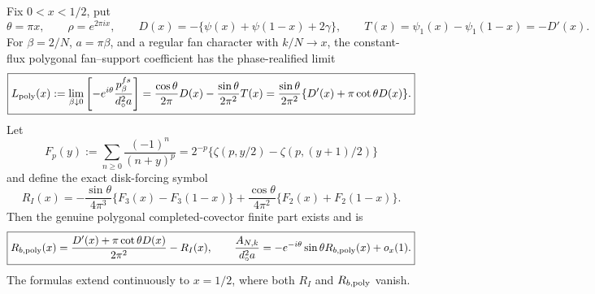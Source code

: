 \begin{lemma}
\label{JC:lem:regular-polygonal-mixed-finite-part}
Fix $0<x<1/2$, put
\[
 \theta=\pi x,\qquad \rho=e^{2\pi ix},\qquad
 D(x)=-\{\psi(x)+\psi(1-x)+2\gamma\},
 \qquad T(x)=\psi_1(x)-\psi_1(1-x)=-D'(x).
\]
For $\beta=2/N$, $a=\pi\beta$, and a regular fan character with
$k/N\to x$, the constant-flux polygonal fan--support coefficient has the
phase-realified limit
\begin{equation}\label{JC:eq:regular-polygonal-mixed-finite-part}
 \boxed{
 L_{\rm poly}(x):=
 \lim_{\beta\downarrow0}
 \left[-e^{i\theta}\frac{p^{fs}_\beta}{d_\circ^2a}\right]
 =\frac{\cos\theta}{2\pi}D(x)
 -\frac{\sin\theta}{2\pi^2}T(x)
 =\frac{\sin\theta}{2\pi^2}
 \{D'(x)+\pi\cot\theta D(x)\}.}
\end{equation}
Let
\[
 F_p(y):=\sum_{n\ge0}\frac{(-1)^n}{(n+y)^p}
 =2^{-p}\{\zeta(p,y/2)-\zeta(p,(y+1)/2)\}
\]
and define the exact disk-forcing symbol
\begin{equation}\label{JC:eq:regular-disk-forcing-finite-part}
 R_I(x)=-\frac{\sin\theta}{4\pi^3}
 \{F_3(x)-F_3(1-x)\}
 +\frac{\cos\theta}{4\pi^2}
 \{F_2(x)+F_2(1-x)\}.
\end{equation}
Then the genuine polygonal completed-covector finite part exists and is
\begin{equation}\label{JC:eq:regular-completed-covector-finite-part}
 \boxed{
 R_{b,{\rm poly}}(x)=
 \frac{D'(x)+\pi\cot\theta D(x)}{2\pi^2}-R_I(x),
 \qquad
 \frac{A_{N,k}}{d_\circ^2a}
 =-e^{-i\theta}\sin\theta R_{b,{\rm poly}}(x)+o_x(1).}
\end{equation}
The formulas extend continuously to $x=1/2$, where both
$R_I$ and $R_{b,{\rm poly}}$ vanish.
\end{lemma}


